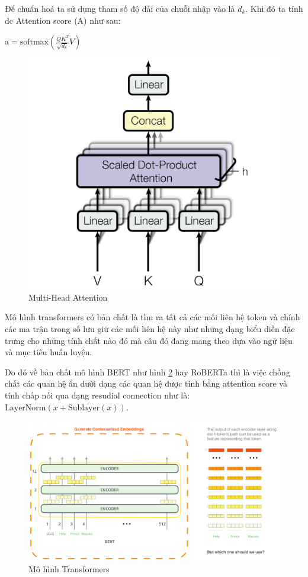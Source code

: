 \documentclass[10pt, conference, a4paper, compsocconf]{IEEEtran}
\begin{document}
Để chuẩn hoá ta sử dụng tham số độ dài của chuỗi nhập vào là $d_k$. Khi đó ta tính dc Attention score (A) như sau:
\begin{center}
$\text {a}= \text {softmax}(\frac{QK^{T}}{\sqrt{d_k}}V)$
\end{center}

\begin{figure}[hbt!]
  \centering
  \includegraphics[width=0.5\linewidth]{Image/multi_head_attn.png}
  \caption{Multi-Head Attention}
  \label{fig:self-attn-2}
\end{figure}

Mô hình transformers có bản chất là tìm ra tất cả các mối liên hệ token và 
chính các ma trận trong số lưu giữ các mối liên hệ này như những dạng biểu diễn đặc trưng cho những tính chất nào đó mà câu đó đang mang theo 
dựa vào ngữ liệu và mục tiêu huấn luyện.

Do đó về bản chất mô hình BERT\cite{Devlin2018} như hình \ref{fig:self-attn-3} 
hay RoBERTa\cite{Liu2019} thì là việc chồng chất các quan hệ ẩn dưới dạng các quan hệ được tính bằng attention score và tính chấp nối qua dạng resudial connection như là:
$\text {LayerNorm}(x+\text {Sublayer}(x))$.
\begin{figure}[hbt!]
  \centering
  \includegraphics[width=\linewidth]{Image/bert.png}
  \caption{Mô hình Transformers}
  \label{fig:self-attn-3}
\end{figure}
\end{document}
